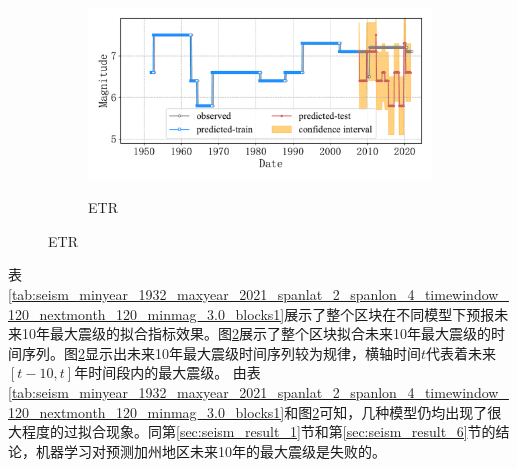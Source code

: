 \begin{figure}[!htbp]
\begin{subfigure}[b]{0.45\textwidth}
  \end{subfigure}
  ~
  \begin{subfigure}[b]{0.45\textwidth}
    \caption{ETR}
    \vspace{-0.2cm}
    \includegraphics[width=\textwidth]{Img/chap5_seism/future10/seism_etr_minyear_1932_maxyear_2021_spanlat_2_spanlon_4_timewindow_120_nextmonth_120_minmag_3.0_blocks1.pdf}
    \vspace{-1cm}
    \label{fig:seism_etr_minyear_1932_maxyear_2021_spanlat_2_spanlon_4_timewindow_120_nextmonth_120_minmag_3.0_blocks1}
  \end{subfigure}
  \label{fig:seism_minyear_1932_maxyear_2021_spanlat_2_spanlon_4_timewindow_120_nextmonth_120_minmag_3.0_blocks1}
\end{figure}


表\ref{tab:seism_minyear_1932_maxyear_2021_spanlat_2_spanlon_4_timewindow_120_nextmonth_120_minmag_3.0_blocks1}展示了整个区块在不同模型下预报未来10年最大震级的拟合指标效果。图\ref{fig:seism_minyear_1932_maxyear_2021_spanlat_2_spanlon_4_timewindow_120_nextmonth_120_minmag_3.0_blocks1}展示了整个区块拟合未来10年最大震级的时间序列。图\ref{fig:seism_minyear_1932_maxyear_2021_spanlat_2_spanlon_4_timewindow_120_nextmonth_120_minmag_3.0_blocks1}显示出未来10年最大震级时间序列较为规律，横轴时间$t$代表着未来$[t-10,t]$年时间段内的最大震级。
由表\ref{tab:seism_minyear_1932_maxyear_2021_spanlat_2_spanlon_4_timewindow_120_nextmonth_120_minmag_3.0_blocks1}和图\ref{fig:seism_minyear_1932_maxyear_2021_spanlat_2_spanlon_4_timewindow_120_nextmonth_120_minmag_3.0_blocks1}可知，几种模型仍均出现了很大程度的过拟合现象。同第\ref{sec:seism_result_1}节和第\ref{sec:seism_result_6}节的结论，机器学习对预测加州地区未来10年的最大震级是失败的。

